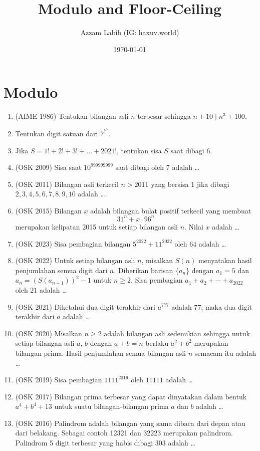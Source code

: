 \documentclass[11pt]{scrartcl}
\title{Modulo and Floor-Ceiling}
\author{Azzam Labib (IG: haxuv.world)}
\date{\today}
\begin{document}
\maketitle
\section{Modulo}
\begin{enumerate}
    \item (AIME 1986) Tentukan bilangan asli $n$ terbesar sehingga $n+10 \mid n^3+100$.
    
    \item Tentukan digit satuan dari $7^{7^7}$.
    
    \item Jika $S=1!+2!+3!+\dots+2021!$, tentukan sisa $S$ saat dibagi 6.
    
    \item (OSK 2009) Sisa saat $10^{999999999}$ saat dibagi oleh 7 adalah \dots
    
    \item (OSK 2011) Bilangan asli terkecil $n>2011$ yang bersisa 1 jika dibagi $2,3,4,5,6,7,8,9,10$ adalah \dots.

    \item (OSK 2015) Bilangan $x$ adalah bilangan bulat positif terkecil yang membuat
    \[31^n + x \cdot 96^n\]
    merupakan kelipatan 2015 untuk setiap bilangan asli $n$. Nilai $x$ adalah \ldots

    \item (OSK 2023) Sisa pembagian bilangan $5^{2022}+11^{2022}$ oleh $64$ adalah \ldots

    \item (OSK 2022) Untuk setiap bilangan asli $n$, misalkan $S(n)$ menyatakan hasil penjumlahan semua digit dari $n$. Diberikan barisan $\{a_n\}$ dengan $a_1 = 5$ dan $a_n = (S(a_{n-1}))^2 - 1$ untuk $n \geq 2$. Sisa pembagian $a_1 + a_2 + \cdots + a_{2022}$ oleh $21$ adalah \ldots
    
    \item (OSK 2021) Diketahui dua digit terakhir dari $a^{777}$ adalah $77$, maka dua digit terakhir dari $a$ adalah \ldots

    \item (OSK 2020) Misalkan $n \geq 2$ adalah bilangan asli sedemikian sehingga untuk setiap bilangan asli $a$, $b$ dengan $a + b = n$ berlaku $a^2 + b^2$ merupakan bilangan prima. Hasil penjumlahan semua bilangan asli $n$ semacam itu adalah \ldots

    \item (OSK 2019) Sisa pembagian $1111^{2019}$ oleh $11111$ adalah \ldots

    \item (OSK 2017) Bilangan prima terbesar yang dapat dinyatakan dalam bentuk $a^4+b^4+13$ untuk suatu bilangan-bilangan prima $a$ dan $b$ adalah \ldots

    \item (OSK 2016) Palindrom adalah bilangan yang sama dibaca dari depan atau dari belakang. Sebagai contoh 12321 dan 32223 merupakan palindrom. Palindrom 5 digit terbesar yang habis dibagi 303 adalah \ldots
\end{enumerate}
\end{document}
